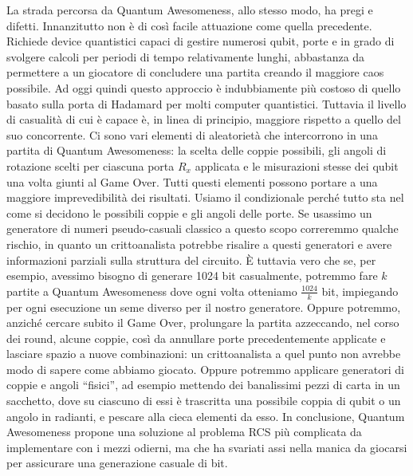 \documentclass{book}
\theoremstyle{definition}
\theoremstyle{definition}
\theoremstyle{definition}
\theoremstyle{plain}
\theoremstyle{plain}
\theoremstyle{plain}
\theoremstyle{plain}
\begin{document}
La strada percorsa da Quantum Awesomeness, allo stesso modo, ha pregi e difetti. Innanzitutto non è di così facile attuazione come quella precedente. Richiede device quantistici capaci di gestire numerosi qubit, porte e in grado di svolgere calcoli per periodi di tempo relativamente lunghi, abbastanza da permettere a un giocatore di concludere una partita creando il maggiore caos possibile. Ad oggi quindi questo approccio è indubbiamente più costoso di quello basato sulla porta di Hadamard per molti computer quantistici. Tuttavia il livello di casualità di cui è capace è, in linea di principio, maggiore rispetto a quello del suo concorrente. Ci sono vari elementi di aleatorietà che intercorrono in una partita di Quantum Awesomeness: la scelta delle coppie possibili, gli angoli di rotazione scelti per ciascuna porta $R_x$ applicata e le misurazioni stesse dei qubit una volta giunti al Game Over. Tutti questi elementi possono portare a una maggiore imprevedibilità dei risultati. Usiamo il condizionale perché tutto sta nel come si decidono le possibili coppie e gli angoli delle porte. Se usassimo un generatore di numeri pseudo-casuali classico a questo scopo correremmo qualche rischio, in quanto un crittoanalista potrebbe risalire a questi generatori e avere informazioni parziali sulla struttura del circuito. È tuttavia vero che se, per esempio, avessimo bisogno di generare 1024 bit casualmente, potremmo fare $k$ partite a Quantum Awesomeness dove ogni volta otteniamo $\frac{1024}{k}$ bit, impiegando per ogni esecuzione un seme diverso per il nostro generatore. Oppure potremmo, anziché cercare subito il Game Over, prolungare la partita azzeccando, nel corso dei round, alcune coppie, così da annullare porte precedentemente applicate e lasciare spazio a nuove combinazioni: un crittoanalista a quel punto non avrebbe modo di sapere come abbiamo giocato. Oppure potremmo applicare generatori di coppie e angoli ``fisici'', ad esempio mettendo dei banalissimi pezzi di carta in un sacchetto, dove su ciascuno di essi è trascritta una possibile coppia di qubit o un angolo in radianti, e pescare alla cieca elementi da esso. In conclusione, Quantum Awesomeness propone una soluzione al problema RCS più complicata da implementare con i mezzi odierni, ma che ha svariati assi nella manica da giocarsi per assicurare una generazione casuale di bit.\\
\end{document}
